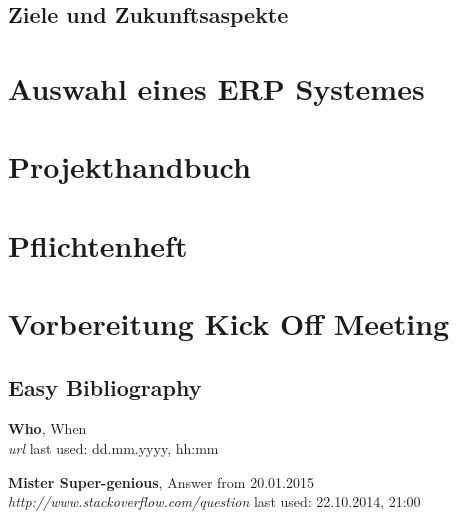\documentclass[12pt]{article}
\begin{document}
\subsection{Ziele und Zukunftsaspekte}

\section{Auswahl eines ERP Systemes}

\section{Projekthandbuch}
\section{Pflichtenheft}
\section{Vorbereitung Kick Off Meeting}




\newpage
\listoftables
\listoffigures
\printglossaries
\subsection{Easy Bibliography}
\begin{thebibliography}{56}

   \textbf{Who}, When\\
  \textit{url}
  \newline last used: dd.mm.yyyy, hh:mm
 
  \textbf{Mister Super-genious}, Answer from 20.01.2015\\
  \textit{http://www.stackoverflow.com/question}
  \newline last used: 22.10.2014, 21:00
\end{thebibliography}
\end{document}
